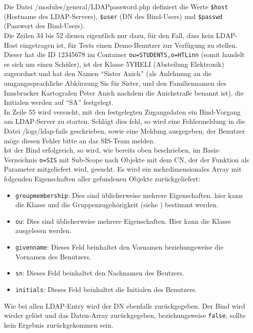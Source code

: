 
Die Datei /modules/general/LDAPpassword.php definiert die Werte \texttt{\$host} (Hostname des LDAP-Servers), \texttt{\$user} (DN des Bind-Users) und  \texttt{\$passwd} (Passwort des Bind-Users).\\
Die Zeilen 34 bis 52 dienen eigentlich nur dazu, für den Fall, dass kein LDAP-Host eingetragen ist, für Tests einen Demo-Benutzer zur Verfügung zu stellen. Dieser hat die ID 12345678 im Container \texttt{ou=STUDENTS,o=HTLinn} (somit handelt es sich um einen Schüler), ist der Klasse 5YHELI (Absteilung Elektronik) zugeordnet und hat den Namen \enquote{Sister Anich} (als Anlehnung an die umgangssprachliche Abkürzung Sis für Sister, und den Familiennamen des Innsbrucker Kartografen Peter Anich nachdem die Anichstraße benannt ist), die Initialen werden auf \enquote{SA} festgelegt.\\
In Zeile 55 wird versucht, mit den festgelegten Zugangsdaten ein Bind-Vorgang am LDAP-Server zu starten. Schlägt dies fehl, so wird eine Fehlermeldung in die Datei /logs/ldap-fails geschrieben, sowie eine Meldung ausgegeben, der Benutzer möge diesen Fehler bitte an das SIS-Team melden.\\
Ist der Bind erfolgreich, so wird, wie bereits oben beschrieben, im Basis-Verzeichnis \texttt{o=SIS} mit Sub-Scope nach Objekte mit dem CN, der der Funktion als Parameter mitgeliefert wird, gesucht. Es wird ein mehrdimensionales Array mit folgenden Eigenschaften aller gefundenen Objekte zurückgeliefert: 
\begin{itemize}
	\item \texttt{groupmembership}: Dies sind üblicherweise mehrere Eigenschaften. hier kann die Klasse und die Gruppenzugehörigkeit (siehe ) bestimmt werden.
	\item \texttt{ou}: Dies sind üblicherweise mehrere Eigenschaften. Hier kann die Klasse ausgelesen werden.
	\item \texttt{givenname}: Dieses Feld beinhaltet den Vornamen beziehungsweise die Vornamen des Benutzers.
	\item \texttt{sn}: Dieses Feld beinhaltet den Nachnamen des Beutzers.
	\item \texttt{initials}: Dieses Feld beinhaltet die Initialen des Benutzers.
\end{itemize}
Wie bei allen LDAP-Entry wird der DN ebenfalls zurückgegeben.
Der Bind wird wieder gelöst und das Daten-Array zurückgegeben, beziehungsweise \texttt{false}, sollte kein Ergebnis zurückgekommen sein.\\

